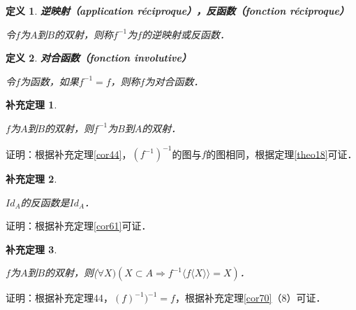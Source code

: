 \documentclass[12pt, a4paper, oneside]{book}
\newtheorem{cor}{补充定理}
\newtheorem{de}{定义}
\begin{document}
			\begin{de}
				\textbf{逆映射（application réciproque），反函数（fonction réciproque）}
				\par
				令$f$为$A$到$B$的双射，则称$f^{-1}$为$f$的逆映射或反函数．
			\end{de}

			\begin{de}
				\textbf{对合函数（fonction involutive）}
				\par
				令$f$为函数，如果$f^{-1}=f$，则称$f$为对合函数．
			\end{de}
			
			\begin{cor}\label{cor76}
				\hfill\par
				$f$为$A$到$B$的双射，则$f^{-1}$为$B$到$A$的双射．
			\end{cor}
			证明：根据补充定理\ref{cor44}，$(f^{-1})^{-1}$的图与$f$的图相同，根据定理\ref{theo18}可证．
			
			\begin{cor}\label{cor77}
				\hfill\par
				$Id_A$的反函数是$Id_A$．
			\end{cor}
			证明：根据补充定理\ref{cor61}可证．
			
			\begin{cor}\label{cor78}
				\hfill\par
				$f$为$A$到$B$的双射，则($\forall X)(X\subset A\Rightarrow f^{-1}\langle f\langle X \rangle \rangle=X)$．
			\end{cor}
			证明：根据补充定理44，$(f)^{-1})^{-1}=f$，根据补充定理\ref{cor70}（8）可证．
			
\end{document}
